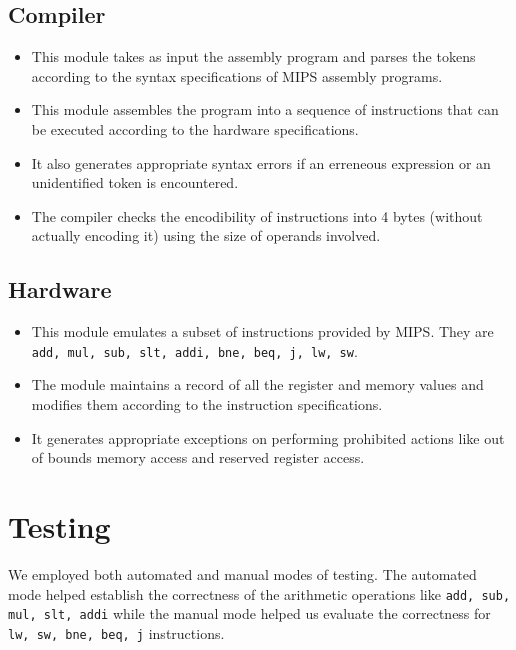 \documentclass[hidelinks,12pt]{article}
\begin{document}
\subsection{Compiler}
\begin{itemize}
    \item This module takes as input the assembly program and parses the tokens according to the syntax specifications of MIPS assembly programs.
    \item This module assembles the program into a sequence of instructions that can be executed according to the hardware specifications.
    \item It also generates appropriate syntax errors if an erreneous expression or an unidentified token is encountered.
    \item The compiler checks the encodibility of instructions into 4 bytes (without actually encoding it) using the size of operands involved.
\end{itemize}
\subsection{Hardware}
\begin{itemize}
    \item This module emulates a subset of instructions provided by MIPS. They are \verb|add, mul, sub, slt, addi, bne, beq, j, lw, sw|.
    \item The module maintains a record of all the register and memory values and modifies them according to the instruction specifications.
    \item It generates appropriate exceptions on performing prohibited actions like out of bounds memory access and reserved register access.
\end{itemize}

\section{Testing}
We employed both automated and manual modes of testing. The automated mode helped establish the correctness of the arithmetic operations like \verb|add, sub, mul, slt, addi| while the manual mode helped us evaluate the correctness for \verb|lw, sw, bne, beq, j| instructions.
\end{document}
